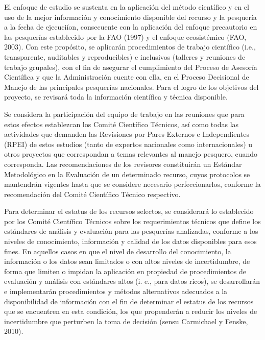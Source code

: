 \documentclass[letter,11pt]{article}
\begin{document}
El enfoque de estudio se sustenta en la aplicaci\'on del m\'etodo cient\'ifico
y en el uso de la mejor informaci\'on y conocimiento disponible del
recurso y la pesquer\'ia a la fecha de ejecuci\'ion, consecuente con la
aplicaci\'on del enfoque precautorio en las pesquer\'ias establecido por la
FAO (1997) y el enfoque ecosist\'emico (FAO, 2003). Con este prop\'osito, se
aplicar\'an procedimientos de trabajo cient\'ifico (i.e., transparente,
auditables y reproducibles) e inclusivos (talleres y reuniones de
trabajo grupales), con el fin de asegurar el cumplimiento del Proceso de
Asesor\'ia Cient\'ifica y que la Administraci\'on cuente con ella, en el
Proceso Decisional de Manejo de las principales pesquer\'ias nacionales.
Para el logro de los objetivos del proyecto, se revisar\'a toda la
informaci\'on cient\'ifica y t\'ecnica disponible.

Se considera la participaci\'on del equipo de trabajo en las reuniones que
para estos efectos establezcan los Comit\'e Cient\'ifico T\'ecnicos, as\'i como
todas las actividades que demanden las Revisiones por Pares Externos e
Independientes (RPEI) de estos estudios (tanto de expertos nacionales
como internacionales) u otros proyectos que correspondan a temas
relevantes al manejo pesquero, cuando corresponda. Las recomendaciones
de los revisores constituir\'an un Est\'andar Metodol\'ogico en la Evaluaci\'on
de un determinado recurso, cuyos protocolos se mantendr\'an vigentes hasta
que se considere necesario perfeccionarlos, conforme la recomendaci\'on
del Comit\'e Cient\'ifico T\'ecnico respectivo.

Para determinar el estatus de los recursos selectos, se considerar\'a lo
establecido por los Comit\'e Cient\'ifico T\'ecnicos sobre los requerimientos
t\'ecnicos que define los est\'andares de an\'alisis y evaluaci\'on para las
pesquer\'ias analizadas, conforme a los niveles de conocimiento,
informaci\'on y calidad de los datos disponibles para esos fines. En
aquellos casos en que el nivel de desarrollo del conocimiento, la
informaci\'on o los datos sean limitados o con altos niveles de
incertidumbre, de forma que limiten o impidan la aplicaci\'on en propiedad
de procedimientos de evaluaci\'on y an\'alisis con est\'andares altos (i. e.,
para datos ricos), se desarrollar\'an e implementar\'an procedimientos y
m\'etodos alternativos adecuados a la disponibilidad de informaci\'on con el
fin de determinar el estatus de los recursos que se encuentren en esta
condici\'on, los que propender\'an a reducir los niveles de incertidumbre
que perturben la toma de decisi\'on (sensu Carmichael y Fenske, 2010).
\end{document}
